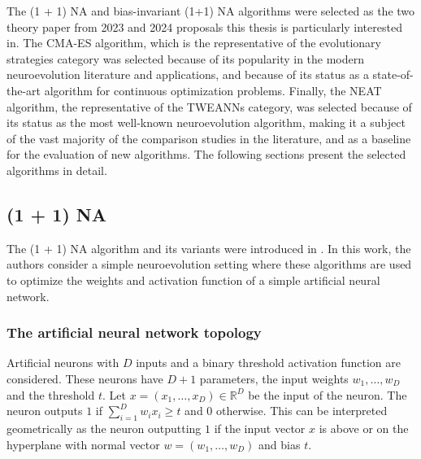 The (1 + 1) NA and bias-invariant (1+1) NA algorithms were selected as the two theory paper from 2023 and 2024 proposals this thesis is particularly interested in.
The CMA-ES algorithm, which is the representative of the evolutionary strategies category was selected because of its popularity in the modern neuroevolution literature
and applications, and because of its status as a state-of-the-art algorithm for continuous optimization problems.
Finally, the NEAT algorithm, the representative of the TWEANNs category, was selected because of its status as the most well-known neuroevolution algorithm, making
it a subject of the vast majority of the comparison studies in the literature, and as a baseline for the evaluation of new algorithms.
The following sections present the selected algorithms in detail.

\subsection{(1 + 1) NA}

The (1 + 1) NA algorithm and its variants were introduced in \cite{na}.
In this work, the authors consider a simple neuroevolution setting where these algorithms are used to optimize the weights and activation function of
a simple artificial neural network.

\subsubsection{The artificial neural network topology}

Artificial neurons with $D$ inputs and a binary threshold activation function are considered.
These neurons have $D + 1$ parameters, the input weights $w_1, \ldots, w_D$ and the threshold $t$.
Let $x = (x_1, \ldots, x_D) \in \mathds{R}^D$ be the input of the neuron. The neuron outputs $1$ if $\sum_{i=1}^D w_i x_i \geq t$ and $0$
otherwise.
This can be interpreted geometrically as the neuron outputting $1$ if the input vector $x$ is above or on the hyperplane with normal vector
$w = (w_1, \ldots, w_D)$ and bias $t$.

